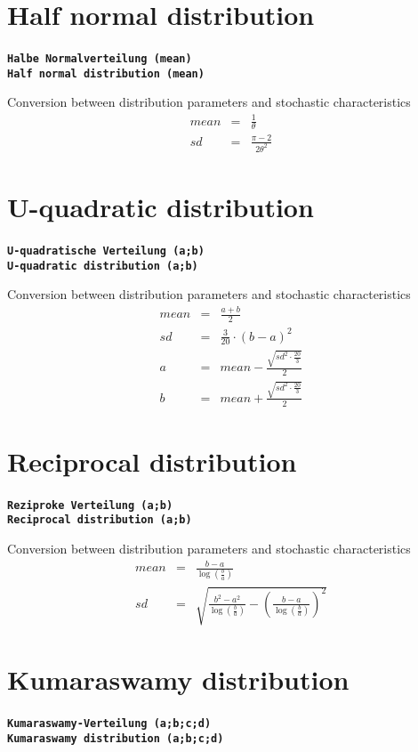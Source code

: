 \documentclass{svmono}
\def\cm#1{\textbf{\texttt{#1}}}
\begin{document}
\section*{Half normal distribution}
\cm{Halbe Normalverteilung (mean)}~\\
\cm{Half normal distribution (mean)}

Conversion between distribution parameters and stochastic characteristics
\begin{eqnarray*}
mean&=&\frac{1}{\theta}\\
sd&=&\frac{\pi-2}{2\theta^2}
\end{eqnarray*}





\section*{U-quadratic distribution}
\cm{U-quadratische Verteilung (a;b)}~\\
\cm{U-quadratic distribution (a;b)}

Conversion between distribution parameters and stochastic characteristics
\begin{eqnarray*}
mean&=&\frac{a+b}{2}\\
sd&=&\frac{3}{20}\cdot(b-a)^2\\
a&=&mean-\frac{\sqrt{sd^2\cdot\frac{20}{3}}}{2}\\
b&=&mean+\frac{\sqrt{sd^2\cdot\frac{20}{3}}}{2}
\end{eqnarray*}





\section*{Reciprocal distribution}
\cm{Reziproke Verteilung (a;b)}~\\
\cm{Reciprocal distribution (a;b)}

Conversion between distribution parameters and stochastic characteristics
\begin{eqnarray*}
mean&=&\frac{b-a}{\log\left(\frac{b}{a}\right)}\\
sd&=&\sqrt{\frac{b^2-a^2}{\log\left(\frac{b}{a}\right)}-\left(\frac{b-a}{\log\left(\frac{b}{a}\right)}\right)^2}
\end{eqnarray*}





\section*{Kumaraswamy distribution}
\cm{Kumaraswamy-Verteilung (a;b;c;d)}~\\
\cm{Kumaraswamy distribution (a;b;c;d)}
\end{document}
